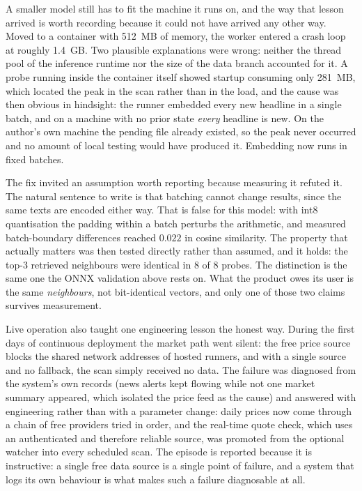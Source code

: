 A smaller model still has to fit the machine it runs on, and the way that lesson arrived is worth
recording because it could not have arrived any other way. Moved to a container with 512~MB of
memory, the worker entered a crash loop at roughly 1.4~GB. Two plausible explanations were wrong:
neither the thread pool of the inference runtime nor the size of the data branch accounted for it. A
probe running inside the container itself showed startup consuming only 281~MB, which located the peak
in the scan rather than in the load, and the cause was then obvious in hindsight: the runner embedded
every new headline in a single batch, and on a machine with no prior state \emph{every} headline is
new. On the author's own machine the pending file already existed, so the peak never occurred and no
amount of local testing would have produced it. Embedding now runs in fixed batches.

The fix invited an assumption worth reporting because measuring it refuted it. The natural sentence to
write is that batching cannot change results, since the same texts are encoded either way. That is
false for this model: with int8 quantisation the padding within a batch perturbs the arithmetic, and
measured batch-boundary differences reached $0.022$ in cosine similarity. The property that actually
matters was then tested directly rather than assumed, and it holds: the top-3 retrieved neighbours were
identical in $8$ of $8$ probes. The distinction is the same one the ONNX validation above rests on.
What the product owes its user is the same \emph{neighbours}, not bit-identical vectors, and only one
of those two claims survives measurement.

Live operation also taught one engineering lesson the honest way. During the first days of continuous
deployment the market path went silent: the free price source blocks the shared network addresses of
hosted runners, and with a single source and no fallback, the scan simply received no data. The failure
was diagnosed from the system's own records (news alerts kept flowing while not one market summary
appeared, which isolated the price feed as the cause) and answered with engineering rather than with a
parameter change: daily prices now come through a chain of free providers tried in order, and the
real-time quote check, which uses an authenticated and therefore reliable source, was promoted from the
optional watcher into every scheduled scan. The episode is reported because it is instructive: a
single free data source is a single point of failure, and a system that logs its own behaviour is what
makes such a failure diagnosable at all.

